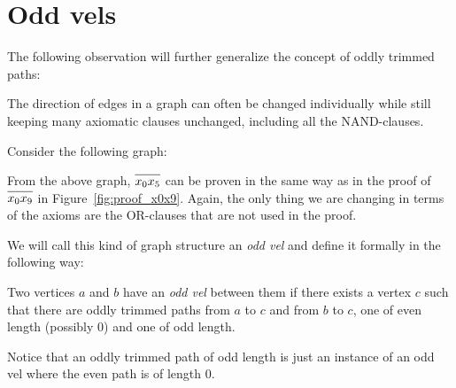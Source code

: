 

\section{Odd vels}
\label{sec:Odd vels}
The following observation will further generalize the concept of oddly trimmed paths:

The direction of edges in a graph can often be changed individually while still keeping many axiomatic clauses unchanged, including all the NAND-clauses.

Consider the following graph:\par
\begin{figure}[!h]
  \centering
  \caption{}
  \label{fig:vel-example}
\end{figure}
\FloatBarrier
From the above graph, $\ol{x_0x_5}$ can be proven in the same way as in the proof of $\ol{x_0x_9}$ in Figure~\ref{fig:proof_x0x9}.
Again, the only thing we are changing in terms of the axioms are the OR-clauses that are not used in the proof.

We will call this kind of graph structure an \textit{odd vel} and define it formally in the following way:
\begin{definition}
  Two vertices $a$ and $b$ have an \textit{odd vel} between them if there exists a vertex $c$ such that there are oddly trimmed paths from $a$ to $c$ and from $b$ to $c$, one of even length (possibly 0) and one of odd length.
\end{definition}
Notice that an oddly trimmed path of odd length is just an instance of an odd vel where the even path is of length 0.

